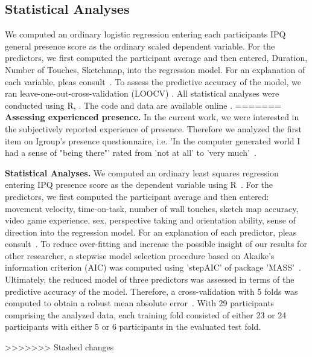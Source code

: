 \subsection{Statistical Analyses}
We computed an ordinary logistic regression entering each participants IPQ general presence score as the ordinary scaled dependent variable. For the predictors, we first computed the participant average and then entered, Duration, Number of Touches, Sketchmap,   into the regression model. For an explanation of each variable, pleas consult~\cite{gehrke2018}. To assess the predictive accuracy of the model, we ran leave-one-out-cross-validation (LOOCV) . All statistical analyses were conducted using R, . The code and data are available online .
=======
\indent \textbf{Assessing experienced presence.} In the current work, we were interested in the subjectively reported experience of presence. Therefore we analyzed the first item on Igroup's presence questionnaire, i.e. 'In the computer generated world I had a sense of "being there"' rated from 'not at all' to 'very much'~\cite{ipq, slaterQ1}.

\indent \textbf{Statistical Analyses.} We computed an ordinary least squares regression entering IPQ presence score as the dependent variable using R~\cite{rver}. For the predictors, we first computed the participant average and then entered: movement velocity, time-on-task, number of wall touches, sketch map accuracy, video game experience, sex, perspective taking and orientation ability, sense of direction into the regression model. For an explanation of each predictor, pleas consult~\cite{gehrke2018}. To reduce over-fitting and increase the possible insight of our results for other researcher, a stepwise model selection procedure based on Akaike's information criterion (AIC) was computed using 'stepAIC' of package 'MASS'~\cite{aic, mass}.
Ultimately, the reduced model of three predictors was assessed in terms of the predictive accuracy of the model. Therefore, a cross-validation with 5 folds was computed to obtain a robust mean absolute error~\cite{cv, mae}. With 29 participants comprising the analyzed data, each training fold consisted of either 23 or 24 participants with either 5 or 6 participants in the evaluated test fold.

>>>>>>> Stashed changes
